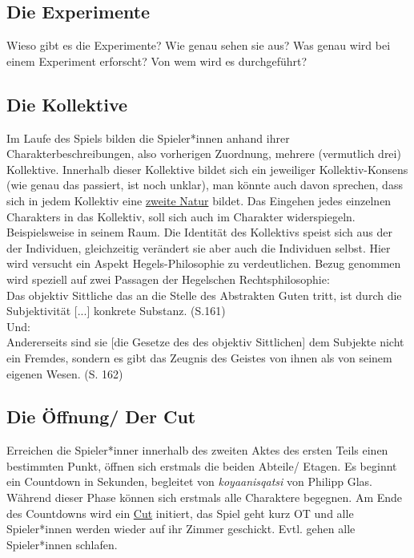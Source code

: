 \documentclass[a4paper, 12pt]{scrartcl}
\begin{document}
    \subsection{Die Experimente}
    Wieso gibt es die Experimente? 
    Wie genau sehen sie aus? 
    Was genau wird bei einem Experiment erforscht? 
    Von wem wird es durchgeführt? \\
    \subsection{Die Kollektive}
    Im Laufe des Spiels bilden die Spieler*innen anhand ihrer Charakterbeschreibungen, also vorherigen Zuordnung, mehrere (vermutlich drei) Kollektive. 
    Innerhalb dieser Kollektive bildet sich ein jeweiliger Kollektiv-Konsens (wie genau das passiert, ist noch unklar), man könnte auch davon sprechen, dass sich in jedem Kollektiv eine \hyperref[zweite-natur]{\glqq zweite Natur\grqq{}} bildet. 
    Das Eingehen jedes einzelnen Charakters in das Kollektiv, soll sich auch im Charakter widerspiegeln. Beispielsweise in seinem Raum. Die Identität des Kollektivs speist sich aus der der Individuen, gleichzeitig verändert sie aber auch die Individuen selbst. 
    Hier wird versucht ein Aspekt Hegels-Philosophie zu verdeutlichen. Bezug genommen wird speziell auf zwei Passagen der Hegelschen Rechtsphilosophie: \\
    \glqq Das objektiv Sittliche das an die Stelle des Abstrakten Guten tritt, ist durch die Subjektivität [...] konkrete Substanz.\grqq{} (S.161)\cite{BuchHegel} \\
    Und:\\
    \glqq Andererseits sind sie [die Gesetze des des objektiv Sittlichen] dem Subjekte nicht ein Fremdes, sondern es gibt das Zeugnis des Geistes von ihnen als von seinem eigenen Wesen.\grqq{} (S. 162)\cite{BuchHegel} 
    \subsection{Die Öffnung/ Der Cut}
    Erreichen die Spieler*inner innerhalb des zweiten Aktes des ersten Teils einen bestimmten Punkt, öffnen sich erstmals die beiden Abteile/ Etagen. 
    Es beginnt ein Countdown in Sekunden, begleitet von \textit{koyaanisqatsi} von Philipp Glas. 
    Während dieser Phase können sich erstmals alle Charaktere begegnen. 
    Am Ende des Countdowns wird ein \hyperref[cut]{Cut} initiert, das Spiel geht kurz OT und alle Spieler*innen werden wieder auf ihr Zimmer geschickt. 
    Evtl. gehen alle Spieler*innen schlafen.  
\end{document}
